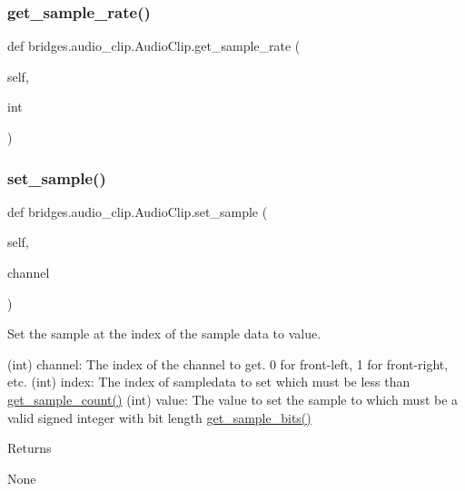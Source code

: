 \mbox{\label{classbridges_1_1audio__clip_1_1_audio_clip_a6e9cad3d81f39b3fe811307f024fa713}} 
\subsubsection{\texorpdfstring{get\+\_\+sample\+\_\+rate()}{get\_sample\_rate()}}
{\footnotesize\ttfamily def bridges.\+audio\+\_\+clip.\+Audio\+Clip.\+get\+\_\+sample\+\_\+rate (\begin{DoxyParamCaption}\item[{}]{self,  }\item[{}]{int }\end{DoxyParamCaption})}

\mbox{\label{classbridges_1_1audio__clip_1_1_audio_clip_af9b9e0b615ada4a6802121f59af3da89}} 
\subsubsection{\texorpdfstring{set\+\_\+sample()}{set\_sample()}}
{\footnotesize\ttfamily def bridges.\+audio\+\_\+clip.\+Audio\+Clip.\+set\+\_\+sample (\begin{DoxyParamCaption}\item[{}]{self,  }\item[{}]{channel }\end{DoxyParamCaption})}



Set the sample at the index of the sample data to value. 

(int) channel\+: The index of the channel to get. 0 for front-\/left, 1 for front-\/right, etc. (int) index\+: The index of sampledata to set which must be less than \hyperlink{classbridges_1_1audio__clip_1_1_audio_clip_ace0227160e6743e8fd19c803af81d474}{get\+\_\+sample\+\_\+count()} (int) value\+: The value to set the sample to which must be a valid signed integer with bit length \hyperlink{classbridges_1_1audio__clip_1_1_audio_clip_a8dc41d20f5c06e83f7aea326072ef32e}{get\+\_\+sample\+\_\+bits()} \begin{DoxyReturn}{Returns}


None 
\end{DoxyReturn}


